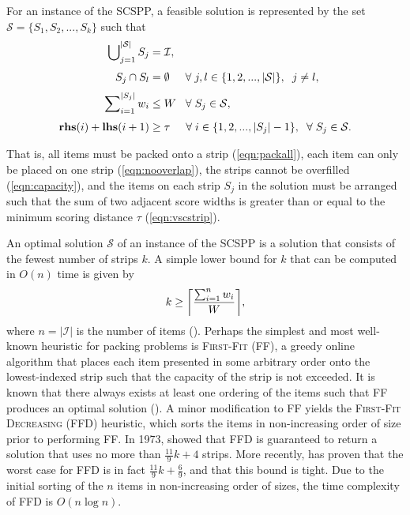 \documentclass[oribibl]{llncs}
\begin{document}
For an instance of the SCSPP, a feasible solution is represented by the set $\mathcal{S} = \{S_1, S_2, ..., S_k\}$ such that
\begin{subequations}
	\begin{align}
		\bigcup\nolimits_{j=1}^{|\mathcal{S}|} S_j &= \mathcal{I}, \label{eqn:packall}\\[3pt]
		S_j \cap S_l &= \emptyset \hspace{5mm} \forall \hspace{1mm} j, l \in \{1, 2, ..., |\mathcal{S}|\}, \hspace{2mm} j \neq l, \label{eqn:nooverlap} \\[3pt]
		\sum\nolimits_{i=1}^{|S_j|}w_i & \leq W \hspace{3mm} \forall \hspace{1mm} S_j \in \mathcal{S}, \label{eqn:capacity} \\[3pt]
		\textup{\textbf{rhs}}(i) + \textup{\textbf{lhs}}(i+1) &\geq \tau \hspace {5mm} \forall \hspace{1mm} i \in \{1, 2, ..., |S_j|-1\}, \hspace{2mm} \forall \hspace{1mm} S_j \in \mathcal{S}. \label{eqn:vscstrip}
\end{align}
\end{subequations}

That is, all items must be packed onto a strip (\ref{eqn:packall}), each item can only be placed on one strip (\ref{eqn:nooverlap}), the strips cannot be overfilled (\ref{eqn:capacity}), and the items on each strip $S_j$ in the solution must be arranged such that the sum of two adjacent score widths is greater than or equal to the minimum scoring distance $\tau$ (\ref{eqn:vscstrip}).

An optimal solution $\mathcal{S}$ of an instance of the SCSPP is a solution that consists of the fewest number of strips $k$. A simple lower bound for $k$ that can be computed in $O(n)$ time is given by 
\begin{equation}
\label{eqn:lowerbound}
k \geq \ceil*{\frac{\sum_{i=1}^{n}w_i}{W}},
\end{equation}
where $n = |\mathcal{I}|$ is the number of items (\citealp{martello1990b}). Perhaps the simplest and most well-known heuristic for packing problems is \textsc{First-Fit} (FF), a greedy online algorithm that places each item presented in some arbitrary order onto the lowest-indexed strip such that the capacity of the strip is not exceeded. It is known that there always exists at least one ordering of the items such that FF produces an optimal solution (\citealp{lewis2009}). A minor modification to FF yields the \textsc{First-Fit Decreasing} (FFD) heuristic, which sorts the items in non-increasing order of size prior to performing FF. In 1973, \citeauthor{johnson1973} showed that FFD is guaranteed to return a solution that uses no more than $\frac{11}{9}k + 4$ strips. More recently, \cite{dosa2007} has proven that the worst case for FFD is in fact $\frac{11}{9}k + \frac{6}{9}$, and that this bound is tight. Due to the initial sorting of the $n$ items in non-increasing order of sizes, the time complexity of FFD is $O(n\log n)$.
\end{document}

